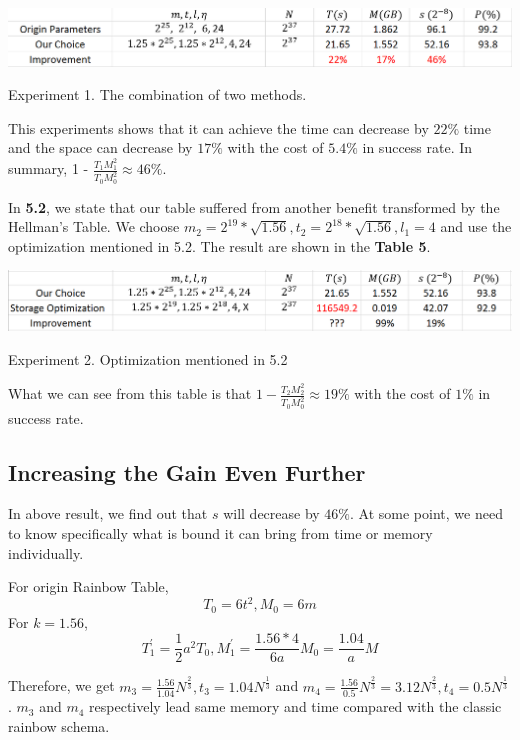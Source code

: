 \documentclass[runningheads,a4paper]{llncs}
\begin{document}
\begin{table}
\includegraphics[width=\linewidth]{table4}
\caption{Experiment 1. The combination of two methods.}
\end{table}

This experiments shows that it can achieve the time can decrease by $22\%$ time and the space can decrease by $17\%$ with the cost of $5.4\%$ in success rate. In summary, 1 - $\frac{T_1 M_1^2}{T_0 M_0^2} \approx 46\%$.

In \textbf{5.2}, we state that our table suffered from another benefit transformed by the Hellman's Table. We choose $m_2 = 2^{19}*\sqrt{1.56}, t_2 = 2^{18}*\sqrt{1.56}, l_1 = 4$ and use the optimization mentioned in 5.2. The result are shown in the \textbf{Table 5}.

\begin{table}
\includegraphics[width=\linewidth]{table5}
\caption{Experiment 2. Optimization mentioned in 5.2}
\end{table}

What we can see from this table is that $1 - \frac{T_2 M_2^2}{T_0 M_0^2} \approx 19\%$ with the cost of $1\%$ in success rate.

\subsection{Increasing the Gain Even Further}

In above result, we find out that $s$ will decrease by $46\%$. At some point, we need to know specifically what is bound it can bring from time or memory individually.

For origin Rainbow Table, 
$$T_0 = 6t^2, M_0 = 6m$$
For $k = 1.56$,
$$T_1^{'} = \frac{1}{2} a^2 T_0, M_1^{'} = \frac{1.56*4}{6 a} M_0 = \frac{1.04}{a} M$$

Therefore, we get $m_3 = \frac{1.56}{1.04} N^{\frac{2}{3}}, t_3 = 1.04 N^{\frac{1}{3}}$ and $m_4 = \frac{1.56}{0.5} N^{\frac{2}{3}} = 3.12 N^{\frac{2}{3}}, t_4 = 0.5 N^{\frac{1}{3}}$. $m_3$ and $m_4$ respectively lead same memory and time compared with the classic rainbow schema. 
\end{document}
